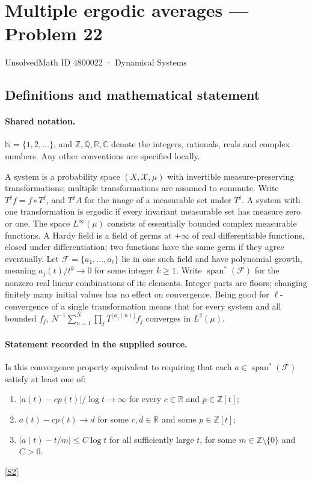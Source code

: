\documentclass[11pt]{article}
\newcommand{\sref}[2]{\hyperlink{source:#1:#2}{[S#2]}}
\begin{document}
\setcounter{section}{4800021}
\section{Multiple ergodic averages — Problem 22}\label{4800022}
{\small\sffamily UnsolvedMath ID 4800022 · Dynamical Systems}
\subsection{Definitions and mathematical statement}

\paragraph{Shared notation.}$\mathbb N=\{1,2,\ldots\}$, and $\mathbb Z,\mathbb Q,\mathbb R,\mathbb C$ denote the integers, rationals, reals and complex numbers. Any other conventions are specified locally.


A system is a probability space $(X,\mathcal X,\mu)$ with invertible measure-preserving transformations; multiple transformations are assumed to commute. Write $T^j f=f\circ T^j$, and $T^j A$ for the image of a measurable set under $T^j$. A system with one transformation is ergodic if every invariant measurable set has measure zero or one. The space $L^\infty(\mu)$ consists of essentially bounded complex measurable functions. A Hardy field is a field of germs at $+\infty$ of real differentiable functions, closed under differentiation; two functions have the same germ if they agree eventually. Let $\mathcal F=\{a_1,\ldots,a_\ell\}$ lie in one such field and have polynomial growth, meaning $a_j(t)/t^k\to0$ for some integer $k\ge1$. Write $\operatorname{span}^*(\mathcal F)$ for the nonzero real linear combinations of its elements. Integer parts are floors; changing finitely many initial values has no effect on convergence. Being good for $\ell$-convergence of a single transformation means that for every system and all bounded $f_j$, $N^{-1}\sum_{n=1}^N\prod_jT^{\lfloor a_j(n)\rfloor}f_j$ converges in $L^2(\mu)$.
\paragraph{Statement recorded in the supplied source.}
Is this convergence property equivalent to requiring that each $a\in\operatorname{span}^*(\mathcal F)$ satisfy at least one of: \begin{enumerate}\item $|a(t)-cp(t)|/\log t\to\infty$ for every $c\in\mathbb R$ and $p\in\mathbb Z[t]$;\item $a(t)-cp(t)\to d$ for some $c,d\in\mathbb R$ and some $p\in\mathbb Z[t]$;\item $|a(t)-t/m|\le C\log t$ for all sufficiently large $t$, for some $m\in\mathbb Z\setminus\{0\}$ and $C>0$.\end{enumerate} \sref{4800022}{2}
\end{document}
